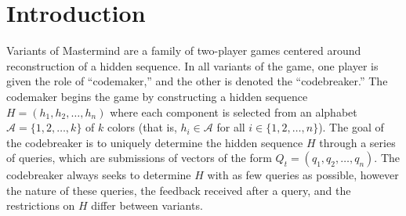 \documentclass[12pt, a4paper]{article}
\author{\theauthor}
\title{\thetitle}
\date{\duedate}
\begin{document}
\maketitle
\begin{abstract}
	We study variants of Mastermind, a popular board game in which the objective is sequence reconstruction. In this two-player game, the codemaker constructs a hidden sequence $H = (h_1, h_2, \ldots, h_n)$ of colors selected from an alphabet $\mathcal{A} = \{1,2,\ldots, k\}$ (\textit{i.e.,} $h_i\in\mathcal{A}$ for all $i\in\{1,2,\ldots, n\}$). The game then proceeds in turns, each of which consists of two parts: in turn $t$, the codebreaker first submits a query sequence $Q_t = (q_1, q_2, \ldots, q_n)$ with $q_i\in \mathcal{A}$ for all $i$, and second receives feedback $\Delta(Q_t, H)$, where $\Delta$ is a function of distance between two $n$-sequences. The game terminates when $Q_t = H$, and the codebreaker seeks to end the game in as few turns as possible. Throughout we let $f(n,k)$ denote the smallest integer such that the codebreaker can determine any $H$ in $f(n,k)$ turns.\cite{VC83} We prove three main results: First, we show that given a set $S_{t}$ of sequences which is known to contain $H$, there always exists a query whose feedback implicitly produces a smaller set $S_{t+1}$ such that $H\in S_{t+1}$ and $|S_{t+1}|\le (1-1/(nk))|S|$. Second, when $H$ is known to be a permutation of the alphabet $\{1,2,\ldots, k\}$, we prove that $f(n,k)\ge n - \log\log(n)$ for all sufficiently large $n$. Third, when feedback is not present in the game, we show that there exists a constant $c>0$ such that $f(n,k)\ge c\cdot n\log(k)$.
\end{abstract}

\section{Introduction}

Variants of Mastermind are a family of two-player games centered around reconstruction of a hidden sequence. In all variants of the game, one player is given the role of ``codemaker,'' and the other is denoted the ``codebreaker.'' The codemaker begins the game by constructing a hidden sequence $H = (h_1, h_2, \ldots, h_n)$ where each component is selected from an alphabet $\mathcal{A} = \{1,2,\ldots,k\}$ of $k$ colors (that is, $h_i\in\mathcal{A}$ for all $i\in\{1,2,\ldots,n\}$). The goal of the codebreaker is to uniquely determine the hidden sequence $H$ through a series of queries, which are submissions of vectors of the form $Q_t = (q_1, q_2, \ldots, q_n)$. The codebreaker always seeks to determine $H$ with as few queries as possible, however the nature of these queries, the feedback received after a query, and the restrictions on $H$ differ between variants.
\end{document}
